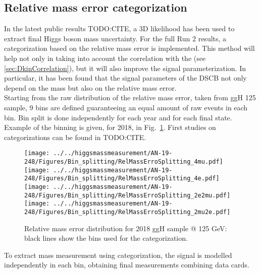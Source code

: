 \subsection{Relative mass error categorization}
\label{sec:SignalParam_N_2D}
In the latest public results TODO:CITE, a 3D likelihood has been used to extract final Higgs boson mass uncertainty. 
For the full Run 2 results, a categorization based on the relative mass error is implemented.
This method will help not only in taking into account the correlation with the \Dkinbkg (see \ref{sec:DkinCorrelation}), but it will also improve the signal parameterization.
In particular, it has been found that the signal parameters of the DSCB not only depend on the mass but also on the relative mass error.\\
Starting from the raw distribution of the relative mass error, taken from ggH 125 \GeV sample, 
9 bins are defined guaranteeing an equal amount of raw events in each bin. Bin split 
is done independently for each year and for each final state. Example of the binning is given, 
for 2018, in  Fig.~\ref{Bin_splitting_2018}. First studies on categorizations can be found in TODO:CITE.
\begin{figure}[!htbp]
\begin{center}
	\texttt{[image: ../../higgsmassmeasurement/AN-19-248/Figures/Bin\_splitting/RelMassErroSplitting\_4mu.pdf]}
	\texttt{[image: ../../higgsmassmeasurement/AN-19-248/Figures/Bin\_splitting/RelMassErroSplitting\_4e.pdf]}
  	\texttt{[image: ../../higgsmassmeasurement/AN-19-248/Figures/Bin\_splitting/RelMassErroSplitting\_2e2mu.pdf]}
	\texttt{[image: ../../higgsmassmeasurement/AN-19-248/Figures/Bin\_splitting/RelMassErroSplitting\_2mu2e.pdf]}
\caption{
	Relative mass error distribution for 2018 ggH sample @ 125 GeV: black lines show 
	the bins used for the categorization.}
\label{Bin_splitting_2018}
\end{center}
\end{figure}
To extract mass measurement using categorization, the signal is modelled independently in each bin, 
obtaining final measurements combining data cards. \\
